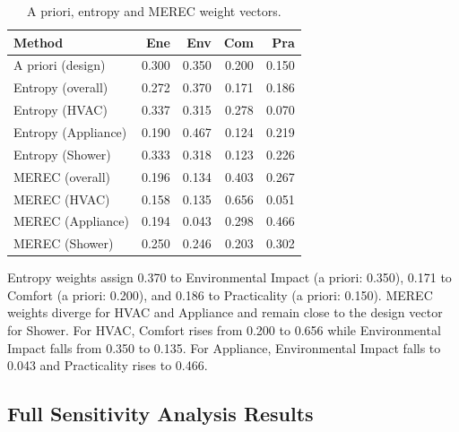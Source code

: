 \documentclass[11pt]{article}
\begin{document}
\begin{table}[htbp]
\caption{A priori, entropy and MEREC weight vectors.}
\label{tab:weight_comparison}
\small
\centering
\renewcommand{\arraystretch}{1.15}
\begin{tabular}{@{}l rrrr@{}}
\toprule
\textbf{Method} & Ene & Env & Com & Pra \\
\midrule
A priori (design)         & 0.300 & 0.350 & 0.200 & 0.150 \\
Entropy (overall)         & 0.272 & 0.370 & 0.171 & 0.186 \\
Entropy (HVAC)            & 0.337 & 0.315 & 0.278 & 0.070 \\
Entropy (Appliance)       & 0.190 & 0.467 & 0.124 & 0.219 \\
Entropy (Shower)          & 0.333 & 0.318 & 0.123 & 0.226 \\
\midrule
MEREC (overall)           & 0.196 & 0.134 & 0.403 & 0.267 \\
MEREC (HVAC)              & 0.158 & 0.135 & 0.656 & 0.051 \\
MEREC (Appliance)         & 0.194 & 0.043 & 0.298 & 0.466 \\
MEREC (Shower)            & 0.250 & 0.246 & 0.203 & 0.302 \\
\bottomrule
\end{tabular}
\renewcommand{\arraystretch}{1.0}
\end{table}

Entropy weights assign 0.370 to Environmental Impact (a priori: 0.350), 0.171 to Comfort (a priori: 0.200), and 0.186 to Practicality (a priori: 0.150). MEREC weights diverge for HVAC and Appliance and remain close to the design vector for Shower. For HVAC, Comfort rises from 0.200 to 0.656 while Environmental Impact falls from 0.350 to 0.135. For Appliance, Environmental Impact falls to 0.043 and Practicality rises to 0.466.

\subsection{Full Sensitivity Analysis Results}
\label{app:sensitivity_full}
\end{document}
